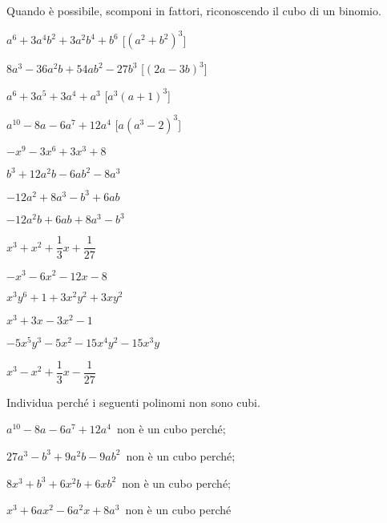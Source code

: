 \begin{esercizio}
\label{ese:16.20}
Quando è possibile, scomponi in fattori, riconoscendo il cubo di un binomio.
\begin{multicols}{2}
\begin{enumeratea}
 \item \(a^{6}+3a^{4}b^{2}+3a^{2}b^{4}+b^{6}\) 
  \hfill [\(\left(a^{2}+b^{2}\right)^{3}\)]
 \item \(8a^{3}-36a^{2}b+54ab^{2}-27b^{3}\) 
  \hfill [\((2a-3b)^{3}\)]
 \item \(a^{6}+3a^{5}+3a^{4}+a^{3}\) 
  \hfill [\(a^{3}(a+1)^{3}\)]
 \item \(a^{10}-8a-6a^{7}+12a^{4}\) 
  \hfill [\(a\left(a^3-2\right)^3\)]
 \item \(-x^{9}-3x^{6}+3x^{3}+8\)
 \item \(b^{3}+12a^{2}b-6ab^{2}-8a^{3}\)
 \item \(-12a^{2}+8a^{3}-b^{3}+6ab\)
 \item \(-12a^{2}b+6ab+8a^{3}-b^{3}\)
 \item \(x^{3}+x^{2}+\dfrac{1}{3}x+\dfrac{1}{27}\)
 \item \(-x^{3}-6x^{2}-12x-8\)
 \item \(x^{3}y^{6}+1+3x^{2}y^{2}+3xy^{2}\)
 \item \(x^{3}+3x-3x^{2}-1\)
 \item \(-5x^{5}y^{3}-5x^{2}-15x^{4}y^{2}-15x^{3}y\)
 \item \(x^{3}-x^{2}+\dfrac{1}{3}x-\dfrac{1}{27}\)
\end{enumeratea}
\end{multicols}
\end{esercizio}

\begin{esercizio}
\label{ese:16.24}
Individua perché i seguenti polinomi non sono cubi.
\begin{enumeratea}
 \item \(a^{10}-8a-6a^{7}+12a^{4}\)\, non è un cubo perché\dotfill;
 \item \(27a^{3}-b^{3}+9a^{2}b-9ab^{2}\)\, non è un cubo perché\dotfill;
 \item \(8x^{3}+b^{3}+6x^{2}b+6{xb}^{2}\)\, non è un cubo perché\dotfill;
 \item \(x^{3}+6ax^{2}-6a^{2}x+8a^{3}\)\, non è un cubo perché\dotfill
\end{enumeratea}
\end{esercizio}

